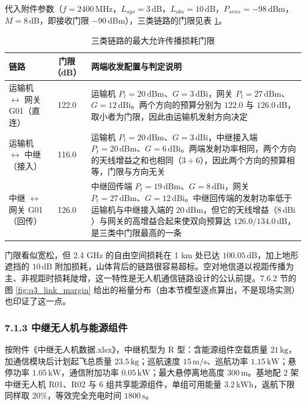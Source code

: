 \documentclass[withoutpreface,bwprint]{format}
\begin{document}
代入附件参数（$f = 2400\,\text{MHz}$，$L_{sys} = 3\,\text{dB}$，$L_{obs} = 10\,\text{dB}$，$P_{sens} = -98\,\text{dBm}$，$M = 8\,\text{dB}$，即接收门限 $-90\,\text{dBm}$），三类链路的门限见表 \ref{tab:q3_limits}。

\begin{table}[H]
\centering
\small
\caption{三类链路的最大允许传播损耗门限}
\label{tab:q3_limits}
\begin{tabularx}{\textwidth}{l c >{\raggedright\arraybackslash}X}
\toprule
\textbf{链路} & \textbf{门限（dB）} & \textbf{两端收发配置与判定说明} \\
\midrule
运输机 $\leftrightarrow$ 网关 G01（直连） & 122.0 & 运输机 $P_t=20\,\text{dBm}$、$G=3\,\text{dBi}$，网关 $P_t=27\,\text{dBm}$、$G=12\,\text{dBi}$。两个方向的预算分别为 $122.0$ 与 $126.0\,\text{dB}$，取小者为门限，因此由运输机发射方向决定 \\
运输机 $\leftrightarrow$ 中继（接入） & 116.0 & 运输机 $P_t=20\,\text{dBm}$、$G=3\,\text{dBi}$，中继接入端 $P_t=20\,\text{dBm}$、$G=6\,\text{dBi}$。两端发射功率相同，两个方向的天线增益之和也相同（$3+6$），因此两个方向的预算相等，门限与方向无关 \\
中继 $\leftrightarrow$ 网关 G01（回传） & 126.0 & 中继回传端 $P_t=19\,\text{dBm}$、$G=8\,\text{dBi}$，网关 $P_t=27\,\text{dBm}$、$G=12\,\text{dBi}$。中继回传端的发射功率低于运输机与中继接入端的 $20\,\text{dBm}$，但它的天线增益（$8\,\text{dBi}$）与网关的高增益合起来使双向预算达 $126.0/134.0\,\text{dB}$，是三类中门限最高的一条 \\
\bottomrule
\end{tabularx}
\end{table}

门限看似宽松，但 2.4 GHz 的自由空间损耗在 1 km 处已达 $100.05\,\text{dB}$，加上地形遮挡的 $10\,\text{dB}$ 附加损耗，山体背后的链路很容易超标。空对地信道以视距传播为主、非视距时损耗陡增，这一特性是无人机通信链路设计的公认前提\cite{zeng2019}。7.6.2 节的图 \ref{fig:q3_link_margin} 给出的裕量分布（由本节模型逐点算出，不是现场实测）也印证了这一点。

\subsubsection{7.1.3 中继无人机与能源组件}
按附件《中继无人机数据.xlsx》，中继机型为 R 型：含能源组件空载质量 $21\,\text{kg}$，加通信模块后计划起飞总质量 $23.5\,\text{kg}$；巡航速度 $15\,\text{m/s}$、巡航功率 $1.15\,\text{kW}$；悬停功率 $1.05\,\text{kW}$，通信附加功率 $0.05\,\text{kW}$；最大悬停离地高度 $300\,\text{m}$。基地配 2 架中继无人机 R01、R02 与 6 组共享能源组件，单组可用能量 $3.2\,\text{kWh}$，返航下限同样取 $20\%$，等效完全充电时间 $1800\,\text{s}$。
\end{document}

